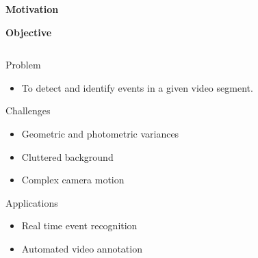 \begin{frame}{\textbf{Motivation}}
\begin{figure}
\begin{subfigure}[c]{0.2\textwidth}
    \end{subfigure}

\end{figure}

\end{frame}

\begin{frame}{\textbf{Objective}}
	\begin{columns}
		\begin{column}{0.55\textwidth}
		\begin{varblock}[\textwidth]{Problem}
			\begin{itemize}
				\item To detect and identify events in a given video segment.
			\end{itemize}
		\end{varblock}
		\begin{varblock}[\textwidth]{Challenges}
			\begin{itemize}
				\item Geometric and photometric variances
				\item Cluttered	 background 
				\item Complex camera motion
			\end{itemize}
		\end{varblock}
		\begin{varblock}[\textwidth]{Applications}
			\begin{itemize}
				\item Real time event recognition
				\item Automated video annotation
			\end{itemize}
		\end{varblock}
		\end{column}
		\begin{column}{0.38\textwidth}
			\centering

\end{column}
\end{columns}
\end{frame}
